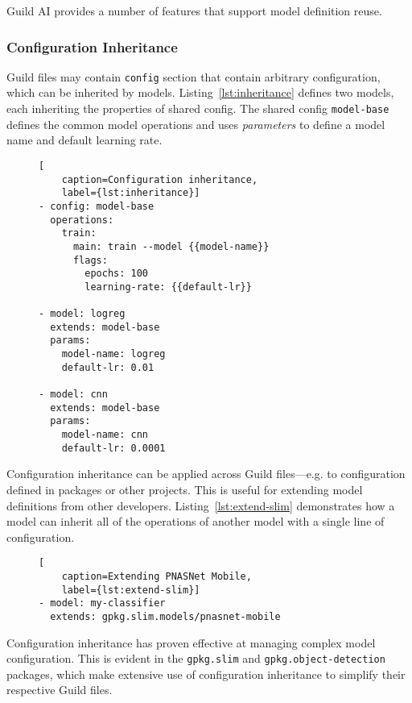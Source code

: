 \documentclass{article}
\begin{document}
Guild AI provides a number of features that support model definition
reuse.

\subsubsection{Configuration Inheritance}

Guild files may contain \verb|config| section that contain arbitrary
configuration, which can be inherited by
models. Listing~\ref{lst:inheritance} defines two models, each
inheriting the properties of shared config. The shared config
\verb|model-base| defines the common model operations and uses
\emph{parameters} to define a model name and default learning rate.

\begin{figure}
\begin{lstlisting}[
    caption=Configuration inheritance,
    label={lst:inheritance}]
- config: model-base
  operations:
    train:
      main: train --model {{model-name}}
      flags:
        epochs: 100
        learning-rate: {{default-lr}}

- model: logreg
  extends: model-base
  params:
    model-name: logreg
    default-lr: 0.01

- model: cnn
  extends: model-base
  params:
    model-name: cnn
    default-lr: 0.0001
\end{lstlisting}
\end{figure}

Configuration inheritance can be applied across Guild files---e.g. to
configuration defined in packages or other projects. This is useful
for extending model definitions from other
developers. Listing~\ref{lst:extend-slim} demonstrates how a model can
inherit all of the operations of another model with a single line of
configuration.

\begin{figure}
\begin{lstlisting}[
    caption=Extending PNASNet Mobile,
    label={lst:extend-slim}]
- model: my-classifier
  extends: gpkg.slim.models/pnasnet-mobile
\end{lstlisting}
\end{figure}

Configuration inheritance has proven effective at managing complex
model configuration. This is evident in the \verb|gpkg.slim| and
\verb|gpkg.object-detection| packages, which make extensive use of
configuration inheritance to simplify their respective Guild files.
\end{document}
